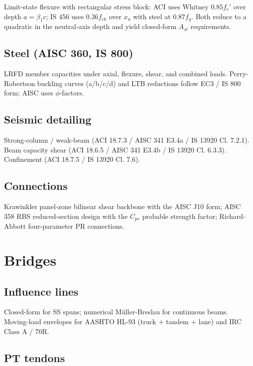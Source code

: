 \documentclass[11pt,a4paper]{report}
\begin{document}
Limit-state flexure with rectangular stress block: ACI uses Whitney
$0.85 f_c'$ over depth $a = \beta_1 c$; IS 456 uses $0.36 f_{ck}$ over
$x_u$ with steel at $0.87 f_y$.  Both reduce to a quadratic in the
neutral-axis depth and yield closed-form $A_{st}$ requirements.

\section{Steel (AISC 360, IS 800)}

LRFD member capacities under axial, flexure, shear, and combined
loads.  Perry-Robertson buckling curves (a/b/c/d) and LTB reductions
follow EC3 / IS 800 form; AISC uses $\phi$-factors.

\section{Seismic detailing}

Strong-column / weak-beam (ACI 18.7.3 / AISC 341 E3.4a / IS 13920
Cl. 7.2.1).  Beam capacity shear (ACI 18.6.5 / AISC 341 E3.4b /
IS 13920 Cl. 6.3.3).  Confinement (ACI 18.7.5 / IS 13920 Cl. 7.6).

\section{Connections}

Krawinkler panel-zone bilinear shear backbone with the AISC J10 form;
AISC 358 RBS reduced-section design with the $C_{pr}$ probable
strength factor; Richard-Abbott four-parameter PR connections.

\chapter{Bridges}
\label{ch:bridges}

\section{Influence lines}

Closed-form for SS spans; numerical Müller-Breslau for continuous
beams.  Moving-load envelopes for AASHTO HL-93 (truck $+$ tandem $+$
lane) and IRC Class A / 70R.

\section{PT tendons}
\end{document}
